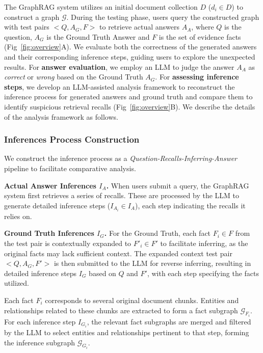 The GraphRAG system utilizes an initial document collection $D$ ($d_i \in D$) to construct a graph $\mathcal{G}$. During the testing phase, users query the constructed graph with test pairs $<Q, A_G, F>$ to retrieve actual answers $A_A$, where $Q$ is the question, $A_G$ is the Ground Truth Answer and $F$ is the set of evidence facts (Fig~\ref{fig:overview}A).
We evaluate both the correctness of the generated answers and their corresponding inference steps, guiding users to explore the unexpected results.
For \textbf{answer evaluation}, we employ an LLM to judge the answer $A_A$ as \textit{correct} or \textit{wrong} based on the Ground Truth $A_G$.
For \textbf{assessing inference steps}, we develop an LLM-assisted analysis framework \cite{wang2023vis+} to reconstruct the inference process for generated answers and ground truth and compare them to identify suspicious retrieval recalls (Fig~\ref{fig:overview}B).
We describe the details of the analysis framework as follows.

\subsubsection{Inferences Process Construction}

We construct the inference process as a \textit{Question-Recalls-Inferring-Answer} pipeline to facilitate comparative analysis.

\textbf{Actual Answer Inferences $I_A$.} When users submit a query, the GraphRAG system first retrieves a series of recalls. These are processed by the LLM to generate detailed inference steps ($I_{A_i} \in I_A$), each step indicating the recalls it relies on.

\textbf{Ground Truth Inferences $I_G$.} For the Ground Truth, each fact $F_i \in F$ from the test pair is contextually expanded to $F'_i \in F'$ to facilitate inferring, as the original facts may lack sufficient context. The expanded context test pair $<Q, A_G, F'>$ is then submitted to the LLM for reverse inferring, resulting in detailed inference steps $I_G$ based on $Q$ and $F'$, with each step specifying the facts utilized.

Each fact $F_i$ corresponds to several original document chunks. Entities and relationships related to these chunks are extracted to form a fact subgraph $\mathcal{G}_{F_i}$. For each inference step $I_{G_i}$, the relevant fact subgraphs are merged and filtered by the LLM to select entities and relationships pertinent to that step, forming the inference subgraph $\mathcal{G}_{G_i}$.

